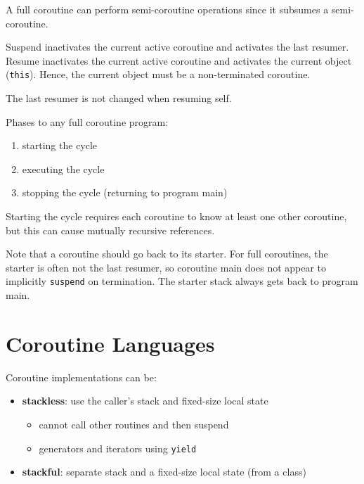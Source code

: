 \documentclass[11pt]{article}
\begin{document}
A full coroutine can perform semi-coroutine operations since it subsumes a semi-coroutine.

Suspend inactivates the current active coroutine and activates the last resumer.
Resume inactivates the current active coroutine and activates the current object (\texttt{this}).
Hence, the current object must be a non-terminated coroutine.

The last resumer is not changed when resuming self.

Phases to any full coroutine program:
\begin{enumerate}
\item starting the cycle
\item executing the cycle
\item stopping the cycle (returning to program main)
\end{enumerate}

Starting the cycle requires each coroutine to know at least one other coroutine, but this can
cause mutually recursive references.

Note that a coroutine should go back to its starter. For full coroutines, the starter is often
not the last resumer, so coroutine main does not appear to implicitly \texttt{suspend} on termination.
The starter stack always gets back to program main.
\section{Coroutine Languages}
\label{sec:org1cfea94}
Coroutine implementations can be:
\begin{itemize}
\item \textbf{stackless}: use the caller's stack and fixed-size local state
\begin{itemize}
\item cannot call other routines and then suspend
\item generators and iterators using \texttt{yield}
\end{itemize}
\item \textbf{stackful}: separate stack and a fixed-size local state (from a class)
\end{itemize}
\end{document}
